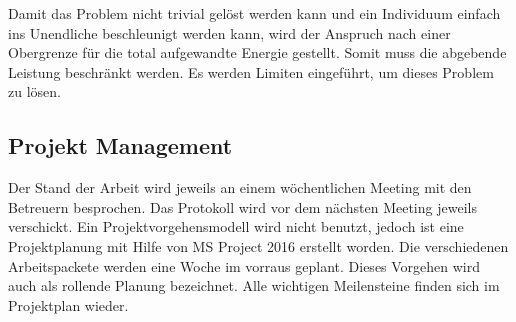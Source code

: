       Damit das Problem nicht trivial gelöst werden kann
      und ein Individuum einfach ins Unendliche beschleunigt werden kann,
      wird der Anspruch nach einer Obergrenze für die total aufgewandte Energie gestellt.
      Somit muss die abgebende Leistung beschränkt werden. Es werden Limiten eingeführt,
      um dieses Problem zu lösen.

    \subsection{Projekt Management}
      Der Stand der Arbeit wird jeweils an einem wöchentlichen Meeting mit den Betreuern besprochen.
      Das Protokoll wird vor dem nächsten Meeting jeweils verschickt.
      Ein Projektvorgehensmodell wird nicht benutzt, jedoch ist eine Projektplanung mit Hilfe von MS Project 2016
      erstellt worden. Die verschiedenen Arbeitspackete werden eine Woche im vorraus geplant.
      Dieses Vorgehen wird auch als rollende Planung bezeichnet. Alle wichtigen Meilensteine finden sich im Projektplan wieder.
